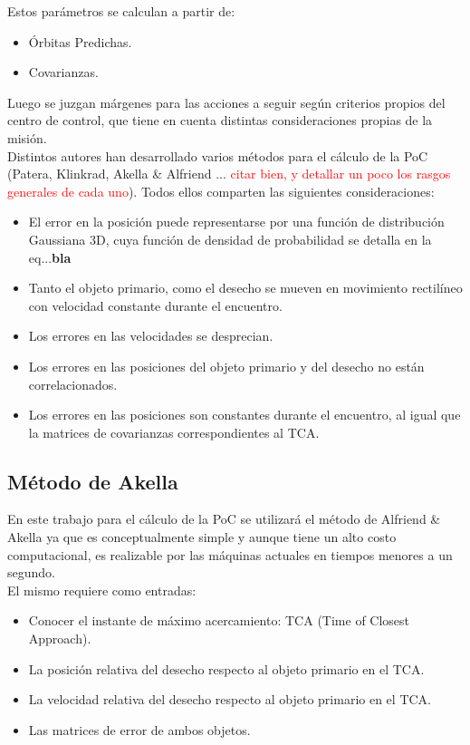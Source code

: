 Estos par\'ametros se calculan a partir de:
\begin{itemize}
\itemsep0em
\item \'Orbitas Predichas.
\item Covarianzas.
\end{itemize}

Luego se juzgan m\'argenes para las acciones a seguir seg\'un criterios propios del centro de control, que tiene en cuenta distintas consideraciones propias de la misi\'on.\\

Distintos autores han desarrollado varios m\'etodos para el c\'alculo de la PoC (Patera, Klinkrad, Akella \& Alfriend ... \textcolor{red}{citar bien,  y detallar un poco los rasgos generales de cada uno}). Todos ellos comparten las siguientes consideraciones:\\
\begin{itemize}
\itemsep0em
\item El error en la posici\'on puede representarse por una funci\'on de distribuci\'on Gaussiana 3D, cuya funci\'on de densidad de probabilidad se detalla en la eq...{\bf{bla}}
\item Tanto el objeto primario, como el desecho se mueven en movimiento rectil\'ineo con velocidad constante durante el encuentro.
\item Los errores en las velocidades se desprecian.
\item Los errores en las posiciones del objeto primario y del desecho no est\'an correlacionados.
\item Los errores en las posiciones son constantes durante el encuentro, al igual que la matrices de covarianzas correspondientes al TCA.
\end{itemize}

\subsection*{M\'etodo de Akella}
En este trabajo para el c\'alculo de la PoC se utilizar\'a el m\'etodo de Alfriend \& Akella \citep{akellaAlfriend} ya que es conceptualmente simple y aunque tiene un alto costo computacional, es realizable por las m\'aquinas actuales en tiempos menores a un segundo.\\

El mismo requiere como entradas:
\begin{itemize}
\itemsep0em
\item Conocer el instante de m\'aximo acercamiento: TCA (Time of Closest Approach).
\item La posici\'on relativa del desecho respecto al objeto primario en el TCA.
\item La velocidad relativa del desecho respecto al objeto primario en el TCA.
\item Las matrices de error de ambos objetos.
\end{itemize}

